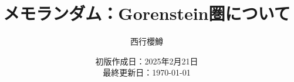 \newcommand{\CATEGORY}{メモランダム}%
\newcommand{\TITLE}{Gorenstein圏について}
\newcommand{\AUTHORNAME}{西行櫻鱒}
\newcommand{\CREATEDAT}{2025年2月21日}

\title{\CATEGORY：\TITLE}
\author{\AUTHORNAME}
\date{初版作成日：\CREATEDAT\\最終更新日：\today\\}

